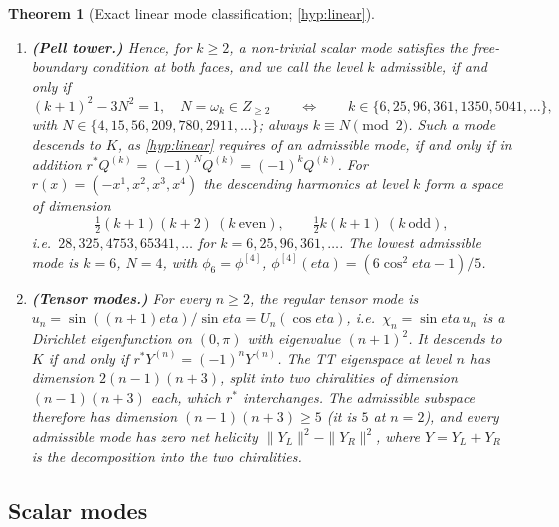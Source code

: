 \documentclass[11pt]{article}
\theoremstyle{canonmath}
\theoremstyle{canonpostulate}
\theoremstyle{canonproposition}
\theoremstyle{canonmath}
\newtheorem{mainthm}{Theorem}
\theoremstyle{canonproposition}
\providecommand{\Klein}{\mathcal{K}}
\providecommand{\Z}{\mathbb{Z}}
\def\mathbb#1{#1}%
\def\mathcal#1{#1}%
\def\eta{eta}%
\begin{document}
\begin{mainthm}[Exact linear mode classification; \ref{hyp:linear}]
\begin{enumerate}[label=(\alph*)]
\item \textbf{(Pell tower.)} Hence, for $k\ge2$, a non-trivial scalar mode satisfies the free-boundary condition at both faces, and we call the level $k$ admissible, if and only if
\begin{equation}
\boxed{(k+1)^2 - 3N^2 = 1,\quad N = \omega_k\in\Z_{\ge2}}
\qquad\Longleftrightarrow\qquad k\in\{6,25,96,361,1350,5041,\dots\},
\label{eq:pell}
\end{equation}
with $N\in\{4,15,56,209,780,2911,\dots\}$; always $k\equiv N\pmod 2$. Such a mode descends to $\Klein$, as \ref{hyp:linear} requires of an admissible mode, if and only if in addition $r^*Q^{(k)} = (-1)^NQ^{(k)} = (-1)^kQ^{(k)}$. For $r(x) = (-x^1,x^2,x^3,x^4)$ the descending harmonics at level $k$ form a space of dimension
\[
\tfrac12(k+1)(k+2)\ (k\ \text{even}), \qquad \tfrac12k(k+1)\ (k\ \text{odd}),
\]
i.e.\ $28, 325, 4753, 65341,\dots$ for $k = 6,25,96,361,\dots$. The lowest admissible mode is $k = 6$, $N=4$, with $\phi_6 = \phi^{[4]}$, $\phi^{[4]}(\eta) = (6\cos^2\eta-1)/5$.
\item \textbf{(Tensor modes.)} For every $n\ge2$, the regular tensor mode is $u_n = \sin((n+1)\eta)/\sin\eta = U_n(\cos\eta)$, i.e.\ $\chi_n = \sin\eta\,u_n$ is a Dirichlet eigenfunction on $(0,\pi)$ with eigenvalue $(n+1)^2$. It descends to $\Klein$ if and only if $r^*Y^{(n)} = (-1)^nY^{(n)}$. The TT eigenspace at level $n$ has dimension $2(n-1)(n+3)$, split into two chiralities of dimension $(n-1)(n+3)$ each, which $r^*$ interchanges. The admissible subspace therefore has dimension $(n-1)(n+3)\ge5$ (it is $5$ at $n = 2$), and every admissible mode has zero net helicity $\|Y_L\|^2-\|Y_R\|^2$, where $Y = Y_L + Y_R$ is the decomposition into the two chiralities.
\end{enumerate}
\end{mainthm}

\subsection{Scalar modes}
\end{document}
